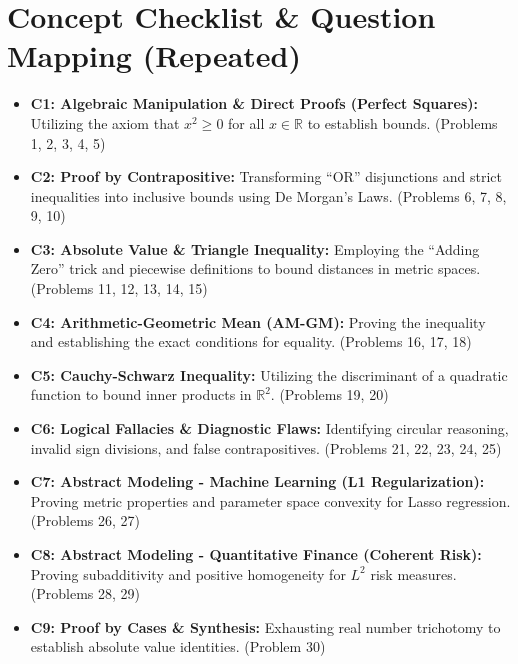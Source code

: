 \documentclass[11pt]{article}
\begin{document}
\section{Concept Checklist \& Question Mapping (Repeated)}
\label{sec:checklist_end}
\begin{itemize}
    \item \textbf{C1: Algebraic Manipulation \& Direct Proofs (Perfect Squares):} Utilizing the axiom that $x^2 \ge 0$ for all $x \in \mathbb{R}$ to establish bounds. (Problems 1, 2, 3, 4, 5)
    \item \textbf{C2: Proof by Contrapositive:} Transforming ``OR'' disjunctions and strict inequalities into inclusive bounds using De Morgan's Laws. (Problems 6, 7, 8, 9, 10)
    \item \textbf{C3: Absolute Value \& Triangle Inequality:} Employing the ``Adding Zero'' trick and piecewise definitions to bound distances in metric spaces. (Problems 11, 12, 13, 14, 15)
    \item \textbf{C4: Arithmetic-Geometric Mean (AM-GM):} Proving the inequality and establishing the exact conditions for equality. (Problems 16, 17, 18)
    \item \textbf{C5: Cauchy-Schwarz Inequality:} Utilizing the discriminant of a quadratic function to bound inner products in $\mathbb{R}^2$. (Problems 19, 20)
    \item \textbf{C6: Logical Fallacies \& Diagnostic Flaws:} Identifying circular reasoning, invalid sign divisions, and false contrapositives. (Problems 21, 22, 23, 24, 25)
    \item \textbf{C7: Abstract Modeling - Machine Learning (L1 Regularization):} Proving metric properties and parameter space convexity for Lasso regression. (Problems 26, 27)
    \item \textbf{C8: Abstract Modeling - Quantitative Finance (Coherent Risk):} Proving subadditivity and positive homogeneity for $L^2$ risk measures. (Problems 28, 29)
    \item \textbf{C9: Proof by Cases \& Synthesis:} Exhausting real number trichotomy to establish absolute value identities. (Problem 30)
\end{itemize}
\end{document}
